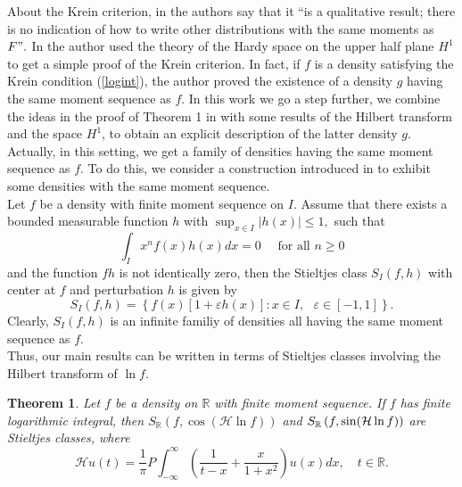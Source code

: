 \documentclass{amsart}
\newtheorem{theorem}{Theorem}
\newcommand{\INT}{\int_{-\infty}^{\infty}}
\begin{document}
About the Krein criterion, in \cite{Ostro} the authors say that it ``is a qualitative result; there is no indication of how to write other distributions with the same
moments as $F".$ In \cite[Theorem 1]{Lin} the author used the theory of the Hardy space on the upper half plane $H^1$ to get a simple proof of the Krein criterion. In fact, if $f$ is a density satisfying the Krein condition (\ref{logint}), the author proved the existence of a density $g$ having the same moment sequence as $f$. In this work we go a step further, we combine the ideas in the proof of Theorem 1 in \cite{Lin} with some results of the Hilbert transform and the space $H^1$, to obtain an explicit description of the latter density $g$.\\ 

Actually, in this setting, we get a family of densities having the same moment sequence as $f$. To do this, we consider a construction introduced in \cite{Stoyanov1} to exhibit some
densities with the same moment sequence. \\

Let $f$ be a density with finite moment sequence on $I$. Assume that there exists a bounded measurable function $h$ with $\sup_{x\in I}\left|
h\left( x\right) \right| \leq 1,$ such that 
$$\int_{I}x^{n}f\left( x\right) h\left( x\right) dx=0 \quad\text{ for all }n\geq 0$$
and the function $fh$ is not identically zero, then the Stieltjes class $S_{I}\left( f,h\right) $ with center at $f $ and perturbation $h$ is given by
\begin{equation*}
S_{I}\left( f,h\right) =\left\{ f\left(x\right) \left[ 1+\varepsilon h\left( x\right) \right] :x\in I,\text{ }\varepsilon \in \left[ -1,1\right] \right\} .
\end{equation*}
Clearly, $S_{I}\left( f,h\right) $ is an infinite familiy of densities all having the same moment sequence as $f$. \\

Thus, our main results can be written in terms of Stieltjes classes involving the Hilbert transform of $\ln f$.
\begin{theorem}\label{ham}
Let $f$ be a density on $\mathbb{R}$ with finite moment
sequence. If $f$ has finite logarithmic integral, then $S_{\mathbb{R}}\left( f,\cos( \mathcal{H}\ln f) \right) $ and $S_{%
\mathbb{R}}\left( f,\sin ( \mathcal{H}\ln f) \right) $ are
Stieltjes classes, where
$$\mathcal{H}u(t)=\frac{1}{\pi} P  \INT \left(\frac{1}{t-x}+\frac{x}{1+x^2} \right)u(x)dx, \quad t\in \mathbb{R}.$$
\end{theorem}
\end{document}
